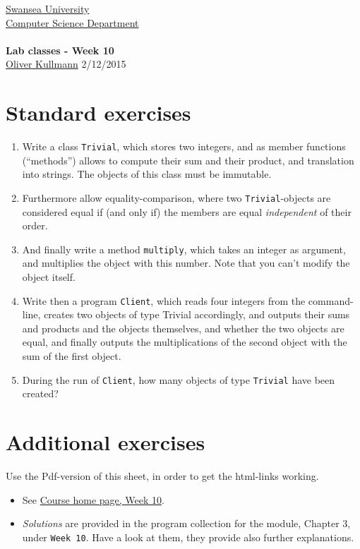 \documentclass[11pt]{article}
\newcommand{\Java}{\lstset{language=Java,keywordstyle=\bfseries,breaklines,breakindent=30pt}}
\begin{document}
\begin{center}
  \href{http://www.swan.ac.uk/}{Swansea University}\\
  \href{http://www.swan.ac.uk/compsci/}{Computer Science Department}\\[1ex]
  \href{\chp}{\module}\\[1ex]
  \textbf{Lab classes - Week 10}\\
  \href{http://cs.swan.ac.uk/~csoliver}{Oliver Kullmann} 2/12/2015
\end{center}


\section{Standard exercises}
\label{sec:stdex}

\Java

\begin{enumerate}
\item Write a class \texttt{Trivial}, which stores two integers, and as member functions (``methods'') allows to compute their sum and their product, and translation into strings. The objects of this class must be immutable.
\item Furthermore allow equality-comparison, where two \texttt{Trivial}-objects are considered equal if (and only if) the members are equal \emph{independent} of their order.
\item And finally write a method \texttt{multiply}, which takes an integer as argument, and multiplies the object with this number. Note that you can't modify the object itself.
\item Write then a program \texttt{Client}, which reads four integers from the command-line, creates two objects of type Trivial accordingly, and outputs their sums and products and the objects themselves, and whether the two objects are equal, and finally outputs the multiplications of the second object with the sum of the first object.
\item During the run of \texttt{Client}, how many objects of type \texttt{Trivial} have been created?
\end{enumerate}


\section{Additional exercises}
\label{sec:addex}

Use the Pdf-version of this sheet, in order to get the html-links working.
\begin{itemize}
\item See \href{\chp#ExercisesWeek10}{Course home page, Week 10}.
\item \emph{Solutions} are provided in the program collection for the module, Chapter 3, under \texttt{Week 10}. Have a look at them, they provide also further explanations.
\end{itemize}
\end{document}
